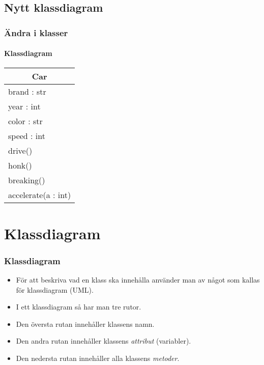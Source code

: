 \documentclass[aspectratio=169]{beamer}
\begin{document}
\subsection{Nytt klassdiagram}

\begin{frame}
	\frametitle{Ändra i klasser}
	\framesubtitle{Klassdiagram}
	
	\centering
	\begin{tabular}{|l|}
		\hline
		\multicolumn{1}{|c|}{\textbf{Car}} \\
		\hline
		brand : str\\
		year : int\\
		color : str\\
		speed : int\\ \hline
		drive() \\
		honk() \\
		breaking() \\
		accelerate(a : int)\\ \hline
	\end{tabular}

\end{frame}

\section{Klassdiagram}

\begin{frame}
	\frametitle{Klassdiagram}
	
	\begin{itemize}
		\item För att beskriva vad en klass ska innehålla använder man av något som kallas för klassdiagram (UML).
		\item I ett klassdiagram så har man tre rutor.
		\item Den översta rutan innehåller klassens namn.
		\item Den andra rutan innehåller klassens \textit{attribut} (variabler).
		\item Den nedersta rutan innehåller alla klassens \textit{metoder}.
	\end{itemize}
	
\end{frame}
\end{document}
